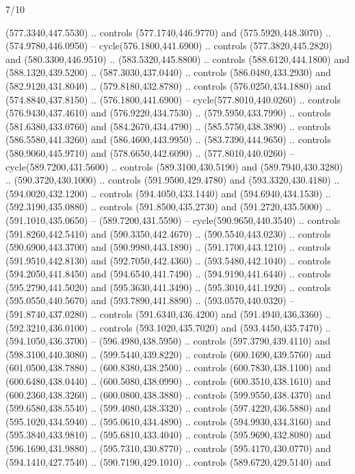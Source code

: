 \begin{flagdescription}{7/10}
\begin{scope}[xshift=0.5\flaglength]
\begin{scope}[scale=0.00185\flagwidth,yshift=245mm,xshift=-43.7mm]
\begin{scope}[y=-0.8pt, x=0.8pt, inner sep=0pt, outer sep=0pt]
\begin{scope}[shift={(-344.0678,183.89831)},fill=brown]
  (577.3340,447.5530) .. controls (577.1740,446.9770) and (575.5920,448.3070) ..
  (574.9780,446.0950) -- cycle(576.1800,441.6900) .. controls
  (577.3820,445.2820) and (580.3300,446.9510) .. (583.5320,445.8800) .. controls
  (588.6120,444.1800) and (588.1320,439.5200) .. (587.3030,437.0440) .. controls
  (586.0480,433.2930) and (582.9120,431.8040) .. (579.8180,432.8780) .. controls
  (576.0250,434.1880) and (574.8840,437.8150) .. (576.1800,441.6900) --
  cycle(577.8010,440.0260) .. controls (576.9430,437.4610) and
  (576.9220,434.7530) .. (579.5950,433.7990) .. controls (581.6380,433.0760) and
  (584.2670,434.4790) .. (585.5750,438.3890) .. controls (586.5580,441.3260) and
  (586.4600,443.9950) .. (583.7390,444.9650) .. controls (580.9060,445.9710) and
  (578.6650,442.6090) .. (577.8010,440.0260) -- cycle(589.7200,431.5600) ..
  controls (589.3100,430.5190) and (589.7940,430.3280) .. (590.3720,430.1000) ..
  controls (591.9500,429.4780) and (593.3320,430.4180) .. (594.0020,432.1200) ..
  controls (594.4050,433.1440) and (594.6940,434.1530) .. (592.3190,435.0880) ..
  controls (591.8500,435.2730) and (591.2720,435.5000) .. (591.1010,435.0650) --
  (589.7200,431.5590) -- cycle(590.9650,440.3540) .. controls
  (591.8260,442.5410) and (590.3350,442.4670) .. (590.5540,443.0230) .. controls
  (590.6900,443.3700) and (590.9980,443.1890) .. (591.1700,443.1210) .. controls
  (591.9510,442.8130) and (592.7050,442.4360) .. (593.5480,442.1040) .. controls
  (594.2050,441.8450) and (594.6540,441.7490) .. (594.9190,441.6440) .. controls
  (595.2790,441.5020) and (595.3630,441.3490) .. (595.3010,441.1920) .. controls
  (595.0550,440.5670) and (593.7890,441.8890) .. (593.0570,440.0320) --
  (591.8740,437.0280) .. controls (591.6340,436.4200) and (591.4940,436.3360) ..
  (592.3210,436.0100) .. controls (593.1020,435.7020) and (593.4450,435.7470) ..
  (594.1050,436.3700) -- (596.4980,438.5950) .. controls (597.3790,439.4110) and
  (598.3100,440.3080) .. (599.5440,439.8220) .. controls (600.1690,439.5760) and
  (601.0500,438.7880) .. (600.8380,438.2500) .. controls (600.7830,438.1100) and
  (600.6480,438.0440) .. (600.5080,438.0990) .. controls (600.3510,438.1610) and
  (600.2360,438.3260) .. (600.0800,438.3880) .. controls (599.9550,438.4370) and
  (599.6580,438.5540) .. (599.4080,438.3320) .. controls (597.4220,436.5880) and
  (595.1020,434.5940) .. (595.0610,434.4890) .. controls (594.9930,434.3160) and
  (595.3840,433.9810) .. (595.6810,433.4040) .. controls (595.9690,432.8080) and
  (596.1690,431.9880) .. (595.7310,430.8770) .. controls (595.4170,430.0770) and
  (594.1410,427.7540) .. (590.7190,429.1010) .. controls (589.6720,429.5140) and

\end{scope}
\end{scope}
\end{scope}
\end{scope}
\end{flagdescription}
